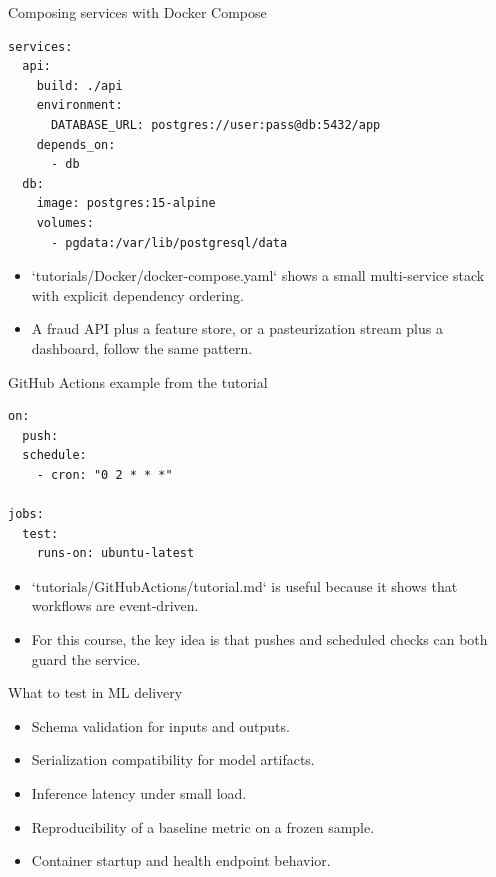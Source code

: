 \begin{frame}[fragile]{Composing services with Docker Compose}
\begin{lstlisting}[style=coursepython]
services:
  api:
    build: ./api
    environment:
      DATABASE_URL: postgres://user:pass@db:5432/app
    depends_on:
      - db
  db:
    image: postgres:15-alpine
    volumes:
      - pgdata:/var/lib/postgresql/data
\end{lstlisting}
\begin{itemize}
\item `tutorials/Docker/docker-compose.yaml` shows a small multi-service stack with explicit dependency ordering.
\item A fraud API plus a feature store, or a pasteurization stream plus a dashboard, follow the same pattern.
\end{itemize}
\coursefooter
\end{frame}

\begin{frame}[fragile]{GitHub Actions example from the tutorial}
\begin{lstlisting}[style=coursepython]
on:
  push:
  schedule:
    - cron: "0 2 * * *"

jobs:
  test:
    runs-on: ubuntu-latest
\end{lstlisting}
\begin{itemize}
\item `tutorials/GitHubActions/tutorial.md` is useful because it shows that workflows are event-driven.
\item For this course, the key idea is that pushes and scheduled checks can both guard the service.
\end{itemize}
\coursefooter
\end{frame}

\begin{frame}{What to test in ML delivery}
\begin{itemize}
\item Schema validation for inputs and outputs.
\item Serialization compatibility for model artifacts.
\item Inference latency under small load.
\item Reproducibility of a baseline metric on a frozen sample.
\item Container startup and health endpoint behavior.
\end{itemize}
\coursefooter
\end{frame}

